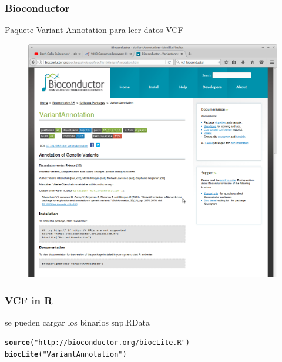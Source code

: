 \documentclass{beamer}\usepackage[]{graphicx}\usepackage[]{color}
\makeatletter
\newcommand{\hlstr}[1]{\textcolor[rgb]{0.192,0.494,0.8}{#1}}%
\newcommand{\hlstd}[1]{\textcolor[rgb]{0.345,0.345,0.345}{#1}}%
\newcommand{\hlkwd}[1]{\textcolor[rgb]{0.737,0.353,0.396}{\textbf{#1}}}%
\newenvironment{kframe}{%
 \def\at@end@of@kframe{}%
 \ifinner\ifhmode%
  \def\at@end@of@kframe{\end{minipage}}%
  \begin{minipage}{\columnwidth}%
 \fi\fi%
 \def\FrameCommand##1{\hskip\@totalleftmargin \hskip-\fboxsep
 \colorbox{shadecolor}{##1}\hskip-\fboxsep
     \hskip-\linewidth \hskip-\@totalleftmargin \hskip\columnwidth}%
 \MakeFramed {\advance\hsize-\width
   \@totalleftmargin\z@ \linewidth\hsize
   \@setminipage}}%
 {\par\unskip\endMakeFramed%
 \at@end@of@kframe}
\newenvironment{knitrout}{}{} %
\makeatother
\begin{document}
\begin{frame}[fragile]
\frametitle{Bioconductor}
Paquete Variant Annotation para leer datos VCF
\begin{figure}[htbp]
\begin{center}
\includegraphics[width=.7\linewidth]{variantaanot.png}
\end{center}
\end{figure}
\end{frame}


\begin{frame}[fragile]
\frametitle{VCF in R}

se pueden cargar los binarios snp.RData
\begin{knitrout}\footnotesize
{}\color{fgcolor}\begin{kframe}
\begin{alltt}
\hlkwd{source}\hlstd{(}\hlstr{"http://bioconductor.org/biocLite.R"}\hlstd{)}
\hlkwd{biocLite}\hlstd{(}\hlstr{"VariantAnnotation"}\hlstd{)}
\end{alltt}
\end{kframe}
\end{knitrout}
\end{frame}
\end{document}
